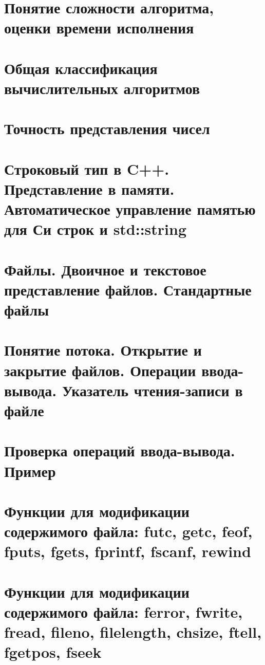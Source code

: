 \section{Понятие сложности алгоритма, оценки времени исполнения}
\section{Общая классификация вычислительных алгоритмов}
\section{Точность представления чисел}
\section{Строковый тип в C++. Представление в памяти. Автоматическое управление памятью для Си строк и std::string}
\section{Файлы. Двоичное и текстовое представление файлов. Стандартные файлы}
\section{Понятие потока. Открытие и закрытие файлов. Операции ввода- вывода. Указатель чтения-записи в файле}
\section{Проверка операций ввода-вывода. Пример}
\section{Функции для модификации содержимого файла: futc, getc, feof, fputs, fgets, fprintf, fscanf, rewind}
\section{Функции для модификации содержимого файла: ferror, fwrite, fread, fileno, filelength, chsize, ftell, fgetpos, fseek}
